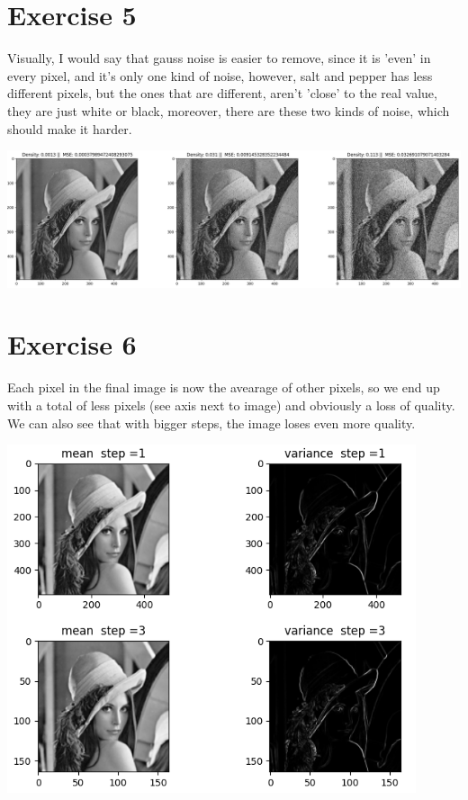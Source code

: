 \documentclass[a4paper]{article}
\begin{document}
\section*{Exercise 5}
Visually, I would say that gauss noise is easier to remove, since it is 'even' in every pixel, and it's only one kind of noise, however, salt and pepper has less different pixels, but the ones that are different, aren't 'close' to the real value, they are just white or black, moreover, there are these two kinds of noise, which should make it harder.
\begin{center}
\includegraphics[width=1\textwidth]{images/exercice_5.PNG}\\[1cm] 
\end{center}

\section*{Exercise 6}
Each pixel in the final image is now the avearage of other pixels, so we end up with a total of less pixels (see axis next to image) and obviously a loss of quality. We can also see that with bigger steps, the image loses even more quality.
\begin{center}
\includegraphics[width=0.9\textwidth]{images/exercice_6.PNG}\\[1cm] 
\end{center}
\end{document}
